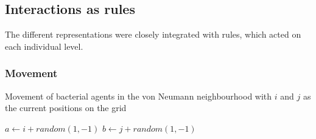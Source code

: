 \subsection{Interactions as rules}
The different representations were closely integrated with rules, which acted on each individual level.

\subsubsection{Movement}
\begin{algorithm}
\caption{Movement of bacterial agents in the von Neumann neighbourhood with $i$ and $j$ as the current positions on the grid}
\SetAlgoLined
$a \leftarrow i+random(1,-1)$\;
$b \leftarrow j+random(1,-1)$\;
\end{algorithm}

